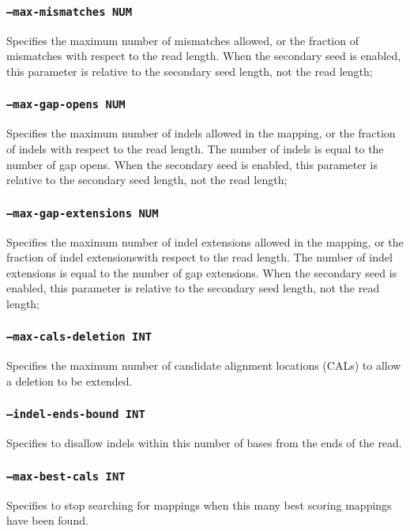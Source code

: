 \documentclass[a4paper,12pt]{book}
\newcommand{\TT}[1]{{\tt #1}} %
\begin{document}
\subsubsection{\TT{--max-mismatches NUM}}
Specifies the maximum number of mismatches allowed, or the fraction of mismatches with respect to the read length.
When the secondary seed is enabled, this parameter is relative to the secondary seed length, not the read length;

\subsubsection{\TT{--max-gap-opens NUM}}
Specifies the maximum number of indels allowed in the mapping, or the fraction of indels with respect to the read length.
The number of indels is equal to the number of gap opens.
When the secondary seed is enabled, this parameter is relative to the secondary seed length, not the read length;

\subsubsection{\TT{--max-gap-extensions NUM}}
Specifies the maximum number of indel extensions allowed in the mapping, or the fraction of indel extensionswith respect to the read length.
The number of indel extensions is equal to the number of gap extensions.
When the secondary seed is enabled, this parameter is relative to the secondary seed length, not the read length;

\subsubsection{\TT{--max-cals-deletion INT}}
Specifies the maximum number of candidate alignment locations (CALs) to allow a deletion to be extended.

\subsubsection{\TT{--indel-ends-bound INT}}
Specifies to disallow indels within this number of bases from the ends of the read.

\subsubsection{\TT{--max-best-cals INT}}
Specifies to stop searching for mappings when this many best scoring mappings have been found.
\end{document}
